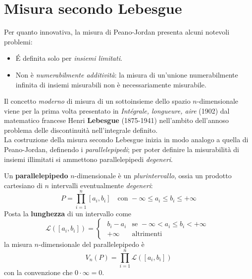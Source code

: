 	\section{Misura secondo Lebesgue}
	Per quanto innovativa, la misura di Peano-Jordan presenta alcuni notevoli problemi:
	\begin{itemize}
		\item É definita solo per \textit{insiemi limitati}.
		\item Non è \textit{numerabilmente additività}: la misura di un'unione numerabilmente infinita di insiemi misurabili non è necessariamente misurabile.
	\end{itemize}
	Il concetto \textit{moderno} di misura di un sottoinsieme dello spazio $n$-dimensionale viene per la prima volta presentato in \textit{Intégrale, longueure, aire} (1902)
	dal matematico francese Henri \textbf{Lebesgue} (1875-1941) nell'ambito dell'annoso problema delle discontinuità nell'integrale definito.\\
	La costruzione della misura secondo Lebesgue inizia in modo analogo a quella di Peano-Jordan, definendo i \textit{parallelepipedi}; per poter definire la misurabilità di insiemi illimitati si ammettono parallelepipedi \textit{degeneri}.
	\begin{define}
		Un \textbf{parallelepipedo} $n$-dimensionale è un \textit{plurintervallo}, ossia un prodotto cartesiano di $n$ intervalli eventualmente \textit{degeneri}:
		\begin{equation}
			P=\prod_{i=1}^{n}\left[a_i,b_i\right]\quad\text{con }-\infty \leq a_i \leq b_i \leq +\infty
		\end{equation}
		Posta la \textbf{lunghezza} di un intervallo come
		\begin{equation}
			\mathcal{L}\left(\left[a_i,b_i\right]\right)=
			\begin{cases}
				\begin{array}{ll}
					b_i-a_i & \text{se }-\infty < a_i \leq b_i < +\infty\\
					+\infty&\text{altrimenti}
				\end{array}
			\end{cases}
		\end{equation}
		la misura $n$-dimensionale del parallelepipedo è
		\begin{equation}
			V_n\left(P\right)=\prod_{i=1}^{n}\mathcal{L}\left(\left[a_i,b_i\right]\right)
		\end{equation}
		con la convenzione che $0\cdot \infty =0$.
	\end{define}
